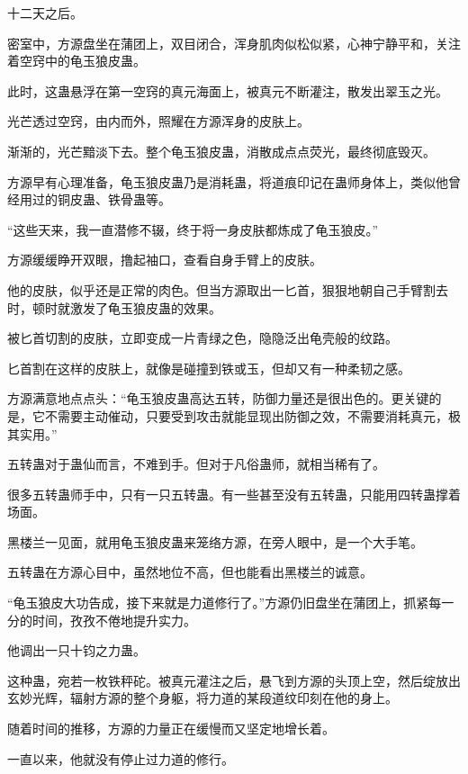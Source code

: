 
\begin{this_body}

十二天之后。

密室中，方源盘坐在蒲团上，双目闭合，浑身肌肉似松似紧，心神宁静平和，关注着空窍中的龟玉狼皮蛊。

此时，这蛊悬浮在第一空窍的真元海面上，被真元不断灌注，散发出翠玉之光。

光芒透过空窍，由内而外，照耀在方源浑身的皮肤上。

渐渐的，光芒黯淡下去。整个龟玉狼皮蛊，消散成点点荧光，最终彻底毁灭。

方源早有心理准备，龟玉狼皮蛊乃是消耗蛊，将道痕印记在蛊师身体上，类似他曾经用过的铜皮蛊、铁骨蛊等。

“这些天来，我一直潜修不辍，终于将一身皮肤都炼成了龟玉狼皮。”

方源缓缓睁开双眼，撸起袖口，查看自身手臂上的皮肤。

他的皮肤，似乎还是正常的肉色。但当方源取出一匕首，狠狠地朝自己手臂割去时，顿时就激发了龟玉狼皮蛊的效果。

被匕首切割的皮肤，立即变成一片青绿之色，隐隐泛出龟壳般的纹路。

匕首割在这样的皮肤上，就像是碰撞到铁或玉，但却又有一种柔韧之感。

方源满意地点点头：“龟玉狼皮蛊高达五转，防御力量还是很出色的。更关键的是，它不需要主动催动，只要受到攻击就能显现出防御之效，不需要消耗真元，极其实用。”

五转蛊对于蛊仙而言，不难到手。但对于凡俗蛊师，就相当稀有了。

很多五转蛊师手中，只有一只五转蛊。有一些甚至没有五转蛊，只能用四转蛊撑着场面。

黑楼兰一见面，就用龟玉狼皮蛊来笼络方源，在旁人眼中，是一个大手笔。

五转蛊在方源心目中，虽然地位不高，但也能看出黑楼兰的诚意。

“龟玉狼皮大功告成，接下来就是力道修行了。”方源仍旧盘坐在蒲团上，抓紧每一分的时间，孜孜不倦地提升实力。

他调出一只十钧之力蛊。

这种蛊，宛若一枚铁秤砣。被真元灌注之后，悬飞到方源的头顶上空，然后绽放出玄妙光辉，辐射方源的整个身躯，将力道的某段道纹印刻在他的身上。

随着时间的推移，方源的力量正在缓慢而又坚定地增长着。

一直以来，他就没有停止过力道的修行。


\end{this_body}
